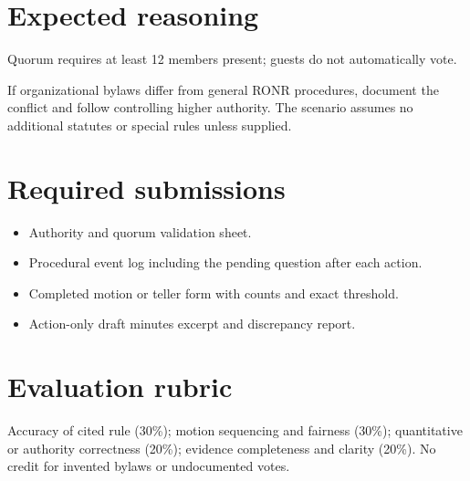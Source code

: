 \documentclass[11pt]{article}
\begin{document}
\section{Expected reasoning}
Quorum requires at least 12 members present; guests do not automatically vote.

If organizational bylaws differ from general RONR procedures, document the conflict and follow controlling higher authority. The scenario assumes no additional statutes or special rules unless supplied.

\section{Required submissions}
\begin{itemize}[leftmargin=*,itemsep=4pt]
\item Authority and quorum validation sheet.
\item Procedural event log including the pending question after each action.
\item Completed motion or teller form with counts and exact threshold.
\item Action-only draft minutes excerpt and discrepancy report.
\end{itemize}

\section{Evaluation rubric}
Accuracy of cited rule (30\%); motion sequencing and fairness (30\%); quantitative or authority correctness (20\%); evidence completeness and clarity (20\%). No credit for invented bylaws or undocumented votes.
\end{document}
